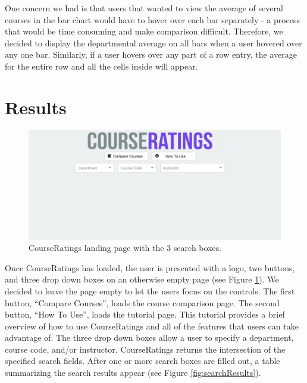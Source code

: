 \documentclass{chi2009}
\begin{document}
One concern we had is that users that wanted to view the average of several courses in the bar chart would have to hover over each bar separately - a process that would be time consuming and make comparison difficult. Therefore, we decided to display the departmental average on all bars when a user hovered over any one bar. Similarly, if a user hovers over any part of a row entry, the average for the entire row and all the cells inside will appear.

\section{Results}

\begin{figure}[t]
\begin{center}
\includegraphics[width=\columnwidth]{figs/landingPage.png}
\vspace*{-0.25in}
\caption{CourseRatings landing page with the 3 search boxes.}
\label{fig:landing}
\end{center}
\end{figure}

Once CourseRatings has loaded, the user is presented with a logo, two buttons, and three drop down boxes on an otherwise empty page (see Figure \ref{fig:landing}). We decided to leave the page empty to let the users focus on the controls. The first button, ``Compare Courses'', loads the course comparison page. The second button, ``How To Use'', loads the tutorial page. This tutorial provides a brief overview of how to use CourseRatings and all of the features that users can take advantage of. The three drop down boxes allow a user to specify a department, course code, and/or instructor. CourseRatings returns the intersection of the specified search fields. After one or more search boxes are filled out, a table summarizing the search results appear (see Figure \ref{fig:searchResults}).
\end{document}
